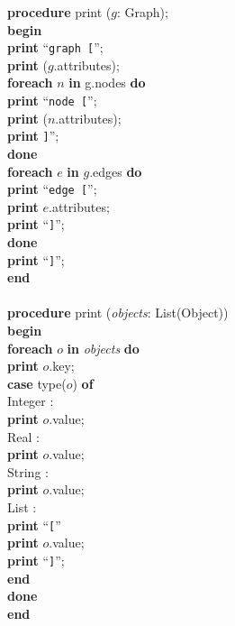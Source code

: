 \begin{program}
\textbf{procedure} print ($g$: Graph); \\
\textbf{begin} \\
\> \textbf{print} ``\verb|graph [|''; \\
\> \textbf{print} ($g$.attributes); \\
\> \textbf{foreach} $n$ \textbf{in} g.nodes \textbf{do} \\
\> \> \textbf{print} ``\verb|node [|''; \\
\> \> \textbf{print} ($n$.attributes); \\
\> \> \textbf{print} \verb|]|''; \\
\> \textbf{done} \\
\> \textbf{foreach} $e$ \textbf{in} $g$.edges \textbf{do} \\
\> \> \textbf{print} ``\verb|edge [|''; \\
\> \> \textbf{print} $e$.attributes; \\
\> \> \textbf{print} ``\verb|]|''; \\
\> \textbf{done} \\
\> \textbf{print} ``\verb|]|''; \\
\textbf{end} \\
\\
\textbf{procedure} print (\emph{objects}: List(Object)) \\
\textbf{begin} \\
\> \textbf{foreach} $o$ \textbf{in} \emph{objects} \textbf{do} \\
\> \> \textbf{print} $o$.key; \\
\> \> \textbf{case} type($o$) \textbf{of} \\
\> \> \> Integer : \\
\> \> \> \> \textbf{print} $o$.value; \\
\> \> \> Real : \\
\> \> \> \> \textbf{print} $o$.value; \\
\> \> \> String : \\
\> \> \> \> \textbf{print} $o$.value;  \\
\> \> \> List : \\
\> \> \> \> \textbf{print} ``\verb|[|'' \\
\> \> \> \> \textbf{print} $o$.value; \\
\> \> \> \> \textbf{print} ``\verb|]|''; \\
\> \> \textbf{end} \\
\> \textbf{done} \\
\textbf{end} \\
\end{program}

